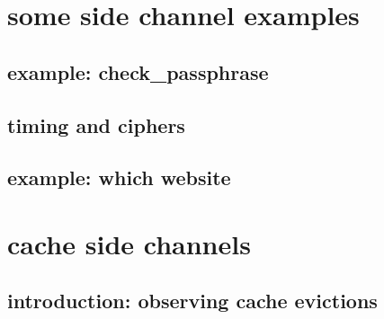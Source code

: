 \date{}
\title{}
\date{}

\begin{frame}
    \titlepage
\end{frame}




\section{some side channel examples}

\subsection{example: check\_passphrase}



\subsection{timing and ciphers}



\subsection{example: which website}






\section{cache side channels}

\subsection{introduction: observing cache evictions}

